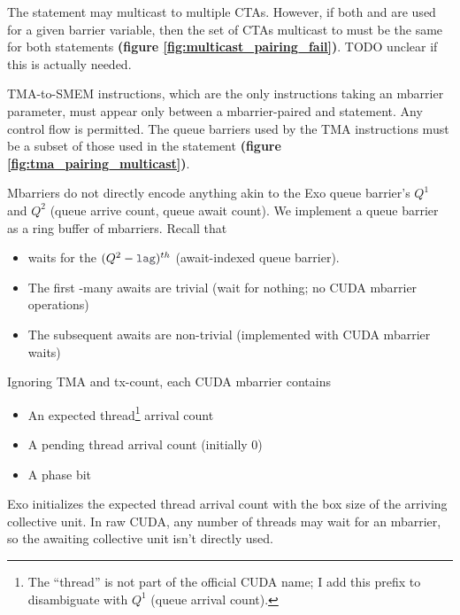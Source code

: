 \begin{figure*}[!b]

\caption{TMA instructions \& mbarrier pairing} \label{fig:tma_pairing_multicast}
\end{figure*}

\filbreak
{}

The  statement may multicast to multiple CTAs.
However, if both  and  are used for a given barrier variable, then the set of CTAs multicast to must be the same for both statements \textbf{(figure \ref{fig:multicast_pairing_fail})}.
TODO unclear if this is actually needed.

\filbreak
{}

TMA-to-SMEM instructions, which are the only instructions taking an mbarrier parameter, must appear only between a mbarrier-paired  and  statement.
Any control flow is permitted.
The queue barriers used by the TMA instructions must be a subset of those used in the  statement \textbf{(figure \ref{fig:tma_pairing_multicast})}.

\filbreak
{}

Mbarriers do not directly encode anything akin to the Exo queue barrier's $Q^1$ and $Q^2$ (queue arrive count, queue await count).
We implement a queue barrier as a ring buffer of mbarriers.
Recall that
\begin{itemize}
  \item {} waits for the $(Q^2 - \lighttt{lag})^{th}$  (await-indexed queue barrier).
  \filbreak
  \item The first -many awaits are trivial (wait for nothing; no CUDA mbarrier operations)
  \filbreak
  \item The subsequent awaits are non-trivial (implemented with CUDA mbarrier waits)
\end{itemize}
\filbreak
Ignoring TMA and tx-count, each CUDA mbarrier contains
\begin{itemize}
  \item An expected thread\footnote{The ``thread'' is not part of the official CUDA name; I add this prefix to disambiguate with $Q^1$ (queue arrival count).} arrival count
  \filbreak
  \item A pending thread arrival count (initially 0)
  \filbreak
  \item A phase bit
\end{itemize}
Exo initializes the expected thread arrival count with the box size of the arriving collective unit.
In raw CUDA, any number of threads may wait for an mbarrier, so the awaiting collective unit isn't directly used.

